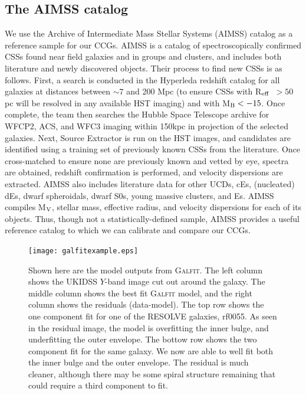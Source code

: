 \documentclass[iop,apj]{emulateapj}
\newcommand{\Reff}{R$_{\rm eff}$}
\begin{document}
\subsection{The AIMSS catalog}
\label{aimss}

\noindent We use the Archive of Intermediate Mass Stellar Systems (AIMSS) catalog \citep{Norris2014,Forbes2014,Janz2015} as a reference sample for our CCGs.  AIMSS is a catalog of spectroscopically confirmed CSSs found near field galaxies and in groups and clusters, and includes both literature and newly discovered objects. Their process to find new CSSs is as follows. First, a search is conducted in the Hyperleda redshift catalog \citep{Paturel2003} for all galaxies at distances between $\sim 7$ and 200 Mpc (to ensure CSSs with \Reff\ $> 50$ pc will be resolved in any available HST imaging) and with M$_{\rm B} < -15$. Once complete, the team then searches the Hubble Space Telescope archive for WFCP2, ACS, and WFC3 imaging within 150kpc in projection of the selected galaxies. Next, Source Extractor is run on the HST images, and candidates are identified using a training set of previously known CSSs from the literature. Once cross-matched to ensure none are previously known and vetted by eye, spectra are obtained, redshift confirmation is performed, and velocity dispersions are extracted. AIMSS also includes literature data for other UCDs, cEs, (nucleated) dEs, dwarf spheroidals, dwarf S0s, young massive clusters, and Es. AIMSS compiles M$_{\rm V}$, stellar mass, effective radius, and velocity dispersions for each of its objects. Thus, though not a statistically-defined sample, AIMSS provides a useful reference catalog to which we can calibrate and compare our CCGs.

\begin{figure}[b]
\begin{center}
\texttt{[image: galfitexample.eps]}
\caption{Shown here are the model outputs from \textsc{Galfit}. The left column shows the UKIDSS $Y$-band image cut out around the galaxy. The middle column shows the best fit \textsc{Galfit} model, and the right column shows the residuals (data-model). The top row shows the one component fit for one of the RESOLVE galaxies, rf0055. As seen in the residual image, the model is overfitting the inner bulge, and underfitting the outer envelope. The bottow row shows the two component fit for the same galaxy. We now are able to well fit both the inner bulge and the outer envelope. The residual is much cleaner, although there may be some spiral structure remaining that could require a third component to fit.}
\label{fig:galfit}
\end{center}
\end{figure}
\end{document}
